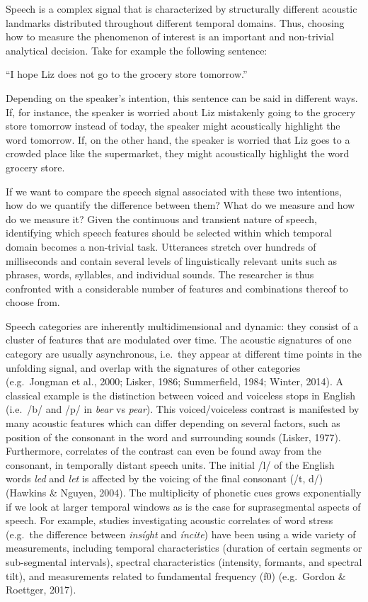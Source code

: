 \documentclass[
  english,
  man]{apa6}
\begin{document}
Speech is a complex signal that is characterized by structurally different acoustic landmarks distributed throughout different temporal domains.
Thus, choosing how to measure the phenomenon of interest is an important and non-trivial analytical decision. Take for example the following sentence:

``I hope Liz does not go to the grocery store tomorrow.''

Depending on the speaker's intention, this sentence can be said in different ways.
If, for instance, the speaker is worried about Liz mistakenly going to the grocery store tomorrow instead of today, the speaker might acoustically highlight the word tomorrow.
If, on the other hand, the speaker is worried that Liz goes to a crowded place like the supermarket, they might acoustically highlight the word grocery store.

If we want to compare the speech signal associated with these two intentions, how do we quantify the difference between them? What do we measure and how do we measure it?
Given the continuous and transient nature of speech, identifying which speech features should be selected within which temporal domain becomes a non-trivial task.
Utterances stretch over hundreds of milliseconds and contain several levels of linguistically relevant units such as phrases, words, syllables, and individual sounds.
The researcher is thus confronted with a considerable number of features and combinations thereof to choose from.

Speech categories are inherently multidimensional and dynamic: they consist of a cluster of features that are modulated over time.
The acoustic signatures of one category are usually asynchronous, i.e.~they appear at different time points in the unfolding signal, and overlap with the signatures of other categories (e.g.~Jongman et al., 2000; Lisker, 1986; Summerfield, 1984; Winter, 2014).
A classical example is the distinction between voiced and voiceless stops in English (i.e.~/b/ and /p/ in \emph{bear} vs \emph{pear}).
This voiced/voiceless contrast is manifested by many acoustic features which can differ depending on several factors, such as position of the consonant in the word and surrounding sounds (Lisker, 1977).
Furthermore, correlates of the contrast can even be found away from the consonant, in temporally distant speech units.
The initial /l/ of the English words \emph{led} and \emph{let} is affected by the voicing of the final consonant (/t, d/) (Hawkins \& Nguyen, 2004).
The multiplicity of phonetic cues grows exponentially if we look at larger temporal windows as is the case for suprasegmental aspects of speech.
For example, studies investigating acoustic correlates of word stress (e.g.~the difference between \emph{insíght} and \emph{íncite}) have been using a wide variety of measurements, including temporal characteristics (duration of certain segments or sub-segmental intervals), spectral characteristics (intensity, formants, and spectral tilt), and measurements related to fundamental frequency (f0) (e.g.~Gordon \& Roettger, 2017).
\end{document}
